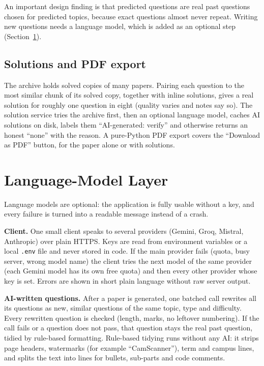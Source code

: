 \documentclass[11pt,a4paper]{article}
\begin{document}
An important design finding is that predicted questions are real past questions chosen for predicted topics, because exact
questions almost never repeat. Writing new questions needs a language model, which is added as an optional step
(Section~\ref{sec:llm}).

\subsection{Solutions and PDF export}
The archive holds solved copies of many papers. Pairing each question to the most similar chunk of its solved copy, together
with inline solutions, gives a real solution for roughly one question in eight (quality varies and notes say so). The
solution service tries the archive first, then an optional language model, caches AI solutions on disk, labels them
``AI-generated: verify'' and otherwise returns an honest ``none'' with the reason. A pure-Python PDF export covers the
``Download as PDF'' button, for the paper alone or with solutions.

\section{Language-Model Layer}
\label{sec:llm}

Language models are optional: the application is fully usable without a key, and every failure is turned into a readable
message instead of a crash.

\textbf{Client.} One small client speaks to several providers (Gemini, Groq, Mistral, Anthropic) over plain HTTPS. Keys are read
from environment variables or a local \texttt{.env} file and never stored in code. If the main provider fails (quota, busy server,
wrong model name) the client tries the next model of the same provider (each Gemini model has its own free quota) and then every
other provider whose key is set. Errors are shown in short plain language without raw server output.

\textbf{AI-written questions.} After a paper is generated, one batched call rewrites all its questions as new, similar
questions of the same topic, type and difficulty. Every rewritten question is checked (length, marks, no leftover numbering). If
the call fails or a question does not pass, that question stays the real past question, tidied by rule-based formatting.
Rule-based tidying runs without any AI: it strips page headers, watermarks (for example ``CamScanner''), term and campus
lines, and splits the text into lines for bullets, sub-parts and code comments.
\end{document}
